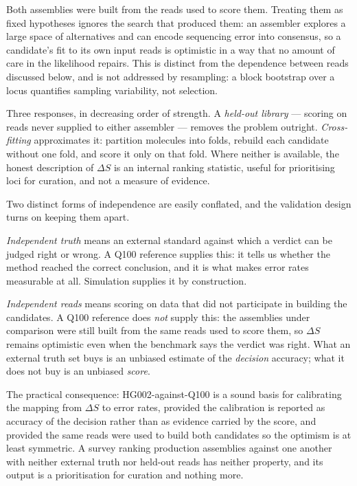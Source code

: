 \documentclass[11pt]{article}
\begin{document}
Both assemblies were built from the reads used to score them.  Treating them as
fixed hypotheses ignores the search that produced them: an assembler explores a
large space of alternatives and can encode sequencing error into consensus, so
a candidate's fit to its own input reads is optimistic in a way that no amount
of care in the likelihood repairs.  This is distinct from the dependence
between reads discussed below, and is not addressed by resampling: a block
bootstrap over a locus quantifies sampling variability, not selection.

Three responses, in decreasing order of strength.  A \emph{held-out library} ---
scoring on reads never supplied to either assembler --- removes the problem
outright.  \emph{Cross-fitting} approximates it: partition molecules into
folds, rebuild each candidate without one fold, and score it only on that fold.
Where neither is available, the honest description of $\Delta S$ is an internal
ranking statistic, useful for prioritising loci for curation, and not a
measure of evidence.

Two distinct forms of independence are easily conflated, and the validation
design turns on keeping them apart.

\emph{Independent truth} means an external standard against which a verdict can
be judged right or wrong.  A Q100 reference supplies this: it tells us whether
the method reached the correct conclusion, and it is what makes error rates
measurable at all.  Simulation supplies it by construction.

\emph{Independent reads} means scoring on data that did not participate in
building the candidates.  A Q100 reference does \emph{not} supply this: the
assemblies under comparison were still built from the same reads used to score
them, so $\Delta S$ remains optimistic even when the benchmark says the verdict
was right.  What an external truth set buys is an unbiased estimate of the
\emph{decision} accuracy; what it does not buy is an unbiased \emph{score}.

The practical consequence: HG002-against-Q100 is a sound basis for calibrating
the mapping from $\Delta S$ to error rates, provided the calibration is
reported as accuracy of the decision rather than as evidence carried by the
score, and provided the same reads were used to build both candidates so the
optimism is at least symmetric.  A survey ranking production assemblies against
one another with neither external truth nor held-out reads has neither
property, and its output is a prioritisation for curation and nothing more.
\end{document}
